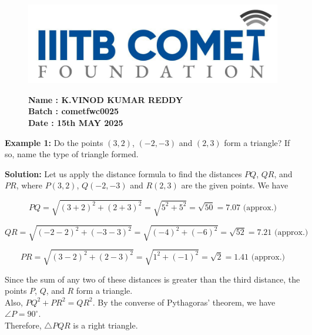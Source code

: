 \documentclass[12pt]{article}
\begin{document}
\begin{figure}[h!]
    \begin{minipage}{0.45\textwidth}  %
        \includegraphics[width=\textwidth]{ki.png}  %
    \end{minipage} \hfill
    \begin{minipage}{0.45\textwidth}  %
        \textbf{Name : K.VINOD KUMAR REDDY} \\
    \textbf{Batch : cometfwc0025} \\
  \textbf{Date : 15th MAY 2025}
    \end{minipage}
\end{figure}
\noindent\textcolor{ncertblue}{\textbf{Example 1:}} Do the points \( (3, 2) \), \( (-2, -3) \) and \( (2, 3) \) form a triangle? If so, name the type of triangle formed.

\vspace{1em}

\noindent\textcolor{ncertblue}{\textbf{Solution:}} Let us apply the distance formula to find the distances \( PQ \), \( QR \), and \( PR \), where \( P(3, 2) \), \( Q(-2, -3) \) and \( R(2, 3) \) are the given points. We have

\[
PQ = \sqrt{(3+2)^2 + (2+3)^2} = \sqrt{5^2 + 5^2} = \sqrt{50} = 7.07 \text{ (approx.)}
\]

\[
QR = \sqrt{(-2 - 2)^2 + (-3 - 3)^2} = \sqrt{(-4)^2 + (-6)^2} = \sqrt{52} = 7.21 \text{ (approx.)}
\]

\[
PR = \sqrt{(3 - 2)^2 + (2 - 3)^2} = \sqrt{1^2 + (-1)^2} = \sqrt{2} = 1.41 \text{ (approx.)}
\]

Since the sum of any two of these distances is greater than the third distance, the points \( P \), \( Q \), and \( R \) form a triangle.\\
Also, \( PQ^2 + PR^2 = QR^2 \). By the converse of Pythagoras' theorem, we have \( \angle P = 90^\circ \).\\
Therefore, \( \triangle PQR \) is a right triangle.
\end{document}
